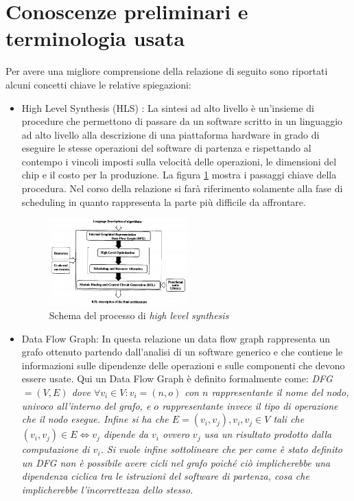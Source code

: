 \documentclass[]{IEEEtran}
\begin{document}
\section{Conoscenze preliminari e terminologia usata}

Per avere una migliore comprensione della relazione di seguito sono riportati alcuni concetti chiave le relative spiegazioni:
\begin{itemize}
	\item High Level Synthesis (HLS) \cite{HLS}: La sintesi ad alto livello è un'insieme di procedure che permettono di passare da un software scritto in un linguaggio ad alto livello alla descrizione di una piattaforma hardware in grado di eseguire le stesse operazioni del software di partenza e rispettando al contempo i vincoli imposti sulla velocità delle operazioni, le dimensioni del chip e il costo per la produzione. La figura \ref{hls} mostra i passaggi chiave della procedura. Nel corso della relazione si farà riferimento solamente alla fase di scheduling in quanto rappresenta la parte più difficile da affrontare.
	\begin{figure}[htp]
		\centering
		\includegraphics[width=0.5\textwidth]{images/Hls_flow.png}
		\caption{Schema del processo di \emph{high level synthesis}}
		\label{hls}
	\end{figure}
	
	\item Data Flow Graph: In questa relazione un data flow graph rappresenta un grafo ottenuto partendo dall'analisi di un software generico e che contiene le informazioni sulle dipendenze delle operazioni e sulle componenti che devono essere usate. Qui un Data Flow Graph è definito formalmente come:
	\it{DFG} \normalfont $=(V,E)$ dove $\forall v_i\in V : v_i = (n,o)$ con $n$ rappresentante il nome del nodo, \emph{univoco} all'interno del grafo, e $o$ rappresentante invece il tipo di operazione che il nodo esegue. Infine si ha che $E = {(v_i,v_j)}, v_i,v_j \in V$ tali che $(v_i,v_j) \in E \iff v_j$ dipende da $v_i$ ovvero $v_j$ usa un risultato prodotto dalla computazione di $v_i$. Si vuole infine sottolineare che per come è stato definito un DFG non è possibile avere cicli nel grafo poiché ciò implicherebbe una dipendenza ciclica tra le istruzioni del software di partenza, cosa che implicherebbe l'incorrettezza dello stesso.
	

\end{itemize}
\end{document}
